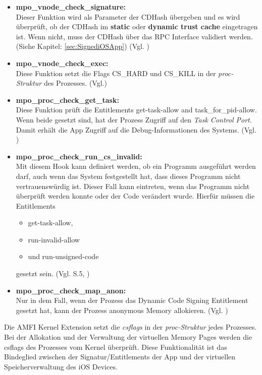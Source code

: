 \begin{itemize}
    \item \label{item:AMFIfunc} \textbf{mpo\_vnode\_check\_signature:} \\
    Dieser Funktion wird als Parameter der CDHash übergeben und es wird überprüft, ob der CDHash im \textbf{static} oder \textbf{dynamic trust cache} eingetragen ist. Wenn nicht, muss der CDHash über das RPC Interface validiert werden. (Siehe Kapitel: \ref{sec:SignediOSApp}) (Vgl. \cite{iOSSec[5], Hacking[1]})
    \item \textbf{mpo\_vnode\_check\_exec:}\\
    Diese Funktion setzt die Flags CS\_HARD und CS\_KILL in der \textit{\glqq proc-Struktur\grqq{}} des Prozesses. (Vgl.\cite{iOSSec[5],  Hacking[1]})
    \item \textbf{mpo\_proc\_check\_get\_task:}\\
    Diese Funktion prüft die Entitlements get-task-allow and task\_for\_pid-allow. Wenn beide gesetzt sind, hat der Prozess Zugriff auf den \textit{\glqq Task Control Port\grqq{}}. Damit erhält  die App Zugriff auf die Debug-Informationen des Systems. (Vgl. \cite{iOSSec[5],  Hacking[1]})
    
    \item \textbf{mpo\_proc\_check\_run\_cs\_invalid:} \\
    Mit diesem Hook kann definiert werden, ob ein Programm ausgeführt werden darf, auch wenn das System festgestellt hat, dass dieses Programm nicht vertrauenswürdig ist. Dieser Fall kann eintreten, wenn das Programm nicht überprüft werden konnte oder der Code verändert wurde. Hierfür müssen die Entitlements 
    \begin{itemize}
        \item get-task-allow, 
        \item run-invalid-allow 
        \item und run-unsigned-code 
     \end{itemize} 
     gesetzt sein. (Vgl. \cite{iOSSec[5]} S.5, \cite{Hacking[1]})
    
    \item \textbf{mpo\_proc\_check\_map\_anon:}\\
    Nur in dem Fall, wenn der Prozess das Dynamic Code Signing Entitlement gesetzt hat, kann der Prozess anonymous Memory allokieren. (Vgl. \cite{iOSSec[5],  Hacking[1]})
\end{itemize}

Die AMFI Kernel Extension setzt die \textit{\glqq csflags\grqq{}} in der \textit{\glqq proc-Struktur\grqq{}} jedes Prozesses. Bei der Allokation und der Verwaltung der virtuellen Memory Pages werden die csflags des Prozesses vom Kernel überprüft. Diese Funktionalität ist das Bindeglied zwischen der Signatur/Entitlements der App und der virtuellen Speicherverwaltung des iOS Devices. 


